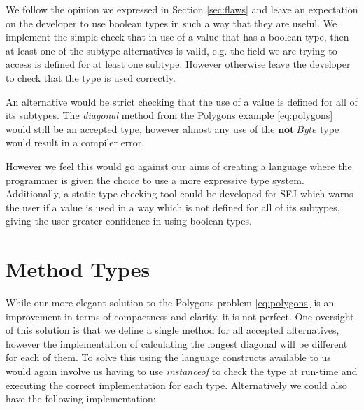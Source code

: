 \documentclass{l4proj}
\begin{document}
We follow the opinion we expressed in Section \ref{sec:flaws} and leave an expectation on the developer to use boolean types in such a way that they are useful.
We implement the simple check that in use of a value that has a boolean type, then at least one of the subtype alternatives is valid, e.g. the field we are trying to access is defined for at least one subtype. However otherwise leave the developer to check that the type is used correctly.

An alternative would be strict checking that the use of a value is defined for all of its subtypes. The \emph{diagonal} method from the Polygons example \ref{eq:polygons} would still be an accepted type, however almost any use of the $\textbf{not}\ Byte$ type would result in a compiler error.

However we feel this would go against our aims of creating a language where the programmer is given the choice to use a more expressive type system.
Additionally, a static type checking tool could be developed for SFJ which warns the user if a value is used in a way which is not defined for all of its subtypes, giving the user greater confidence in using boolean types.

\section{Method Types}

While our more elegant solution to the Polygons problem \ref{eq:polygons} is an improvement in terms of compactness and clarity, it is not perfect.
One oversight of this solution is that we define a single method for all accepted alternatives, however the implementation of calculating the longest diagonal will be different for each of them.
To solve this using the language constructs available to us would again involve us having to use \emph{instanceof} to check the type at run-time and executing the correct implementation for each type.
Alternatively we could also have the following implementation:
\end{document}
